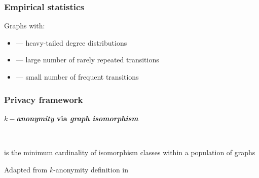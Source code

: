 \documentclass[hyperref={colorlinks = true},unknownkeysallowed]{beamer}
\let\oldcitep=\citep
\renewcommand\citep[1]{\hypersetup{linkcolor=UBCblue}\hyperlink{#1}{\oldcitep{#1}}}
\begin{document}
\begin{frame}
	\frametitle{Empirical statistics}
	Graphs with:
	\begin{itemize}
		\vspace{0.2cm}
		\item --- heavy-tailed degree distributions
		\vspace{0.2cm}
		\item --- large number of rarely repeated transitions
		\vspace{0.2cm}
		\item --- small number of frequent transitions
	\end{itemize}
\end{frame}


\begin{frame}
	\frametitle{Privacy framework}
	\begin{center}
	\textbf{\emph{$k-$anonymity}  via  \emph{graph isomorphism}}
	\end{center}\\
\begin{tcolorbox}[colback=green!5,colframe=white!40!black,title=Graph $k-$anonymity] 
	 is the minimum  cardinality of isomorphism
	classes within a population of graphs
\end{tcolorbox}
	\begin{flushright}
	Adapted from $k$-anonymity definition in~\Fontvi\citep{sweeney2002k}\hfill
    \end{flushright}
\end{frame}
\end{document}
